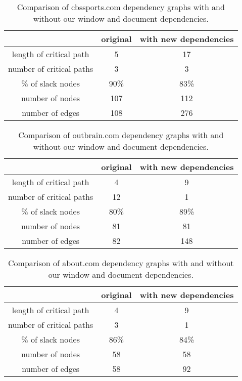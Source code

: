\begin{table*}[tb]
\centering
\small
\begin{tabular}{|c|c|c|}
\hline
 & original & with new dependencies \\
\hline
length of critical path & 5 & 17 \\
number of critical paths & 3 & 3 \\
\% of slack nodes & 90\% & 83\% \\
number of nodes & 107 & 112 \\
number of edges & 108 & 276 \\
\hline
\end{tabular}\caption{Comparison of cbssports.com dependency graphs with and without our window and document dependencies.}
\label{t:cbssportsgraph}
\end{table*}

\begin{table*}[tb]
\centering
\small
\begin{tabular}{|c|c|c|}
\hline
 & original & with new dependencies \\
\hline
length of critical path & 4 & 9 \\
number of critical paths & 12 & 1 \\
\% of slack nodes & 80\% & 89\% \\
number of nodes & 81 & 81 \\
number of edges & 82 & 148 \\
\hline
\end{tabular}\caption{Comparison of outbrain.com dependency graphs with and without our window and document dependencies.}
\label{t:outbraingraph}
\end{table*}


\begin{table*}[tb]
\centering
\small
\begin{tabular}{|c|c|c|}
\hline
 & original & with new dependencies \\
\hline
length of critical path & 4 & 9 \\
number of critical paths & 3 & 1 \\
\% of slack nodes & 86\% & 84\% \\
number of nodes & 58 & 58 \\
number of edges & 58 & 92 \\
\hline
\end{tabular}\caption{Comparison of about.com dependency graphs with and without our window and document dependencies.}
\label{t:aboutgraph}
\end{table*}


